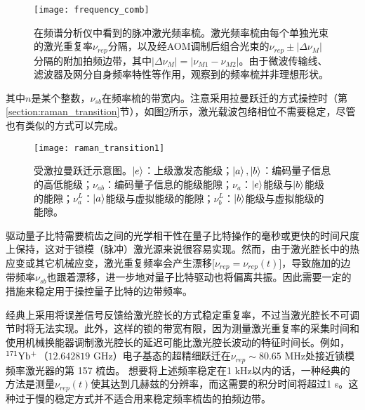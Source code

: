 \begin{figure}
    \centering
    \texttt{[image: frequency\_comb]}
    \caption[脉冲激光频率梳]{在频谱分析仪中看到的脉冲激光频率梳。激光频率梳由每个单独光束的激光重复率$\nu_{rep}$分隔，以及经AOM调制后组合光束的$\nu_{rep}\pm |\Delta \nu_M|$分隔的附加拍频边带，其中$|\Delta \nu_M|=|\nu_{M1}-\nu_{M2}|$。由于微波传输线、滤波器及网分自身频率特性等作用，观察到的频率梳并非理想形状。\label{fig:frequency_comb}}
\end{figure}

其中$n$是某个整数，$\nu_{sb}$在频率梳的带宽内。注意采用拉曼跃迁的方式操控时（第\ref{section:raman_transition}节），如图\ref{fig:raman_transition1}所示，激光载波包络相位不需要稳定\cite[]{Peer_Shapiro_Stowe_Shapiro_Ye_2007}，尽管也有类似的方式可以完成\cite[]{Koke_Grebing_Frei_Anderson_Assion_Steinmeyer_2010}。

\begin{figure}
    \centering
    \texttt{[image: raman\_transition1]}
    \caption[受激拉曼跃迁示意图]{受激拉曼跃迁示意图。$\ket{e}$：上级激发态能级；$\ket{a},\ket{b}$：编码量子信息的高低能级；$\nu_{ab}$：编码量子信息的能级能隙；$\nu_{a}$：$\ket{e}$能级与$\ket{b}$能级的能隙；$\nu_a^L$：$\ket{a}$能级与虚拟能级的能隙；$\nu_b^L$：$\ket{b}$能级与虚拟能级的能隙。\label{fig:raman_transition1}}
\end{figure}

驱动量子比特需要梳齿之间的光学相干性在量子比特操作的毫秒或更快的时间尺度上保持，这对于锁模（脉冲）激光源来说很容易实现\cite[]{Hayes_Matsukevich_Maunz_Hucul_Quraishi_Olmschenk_Campbell_Mizrahi_Senko_Monroe_2010}。然而，由于激光腔长中的热应变或其它机械应变，激光重复频率会产生漂移[$\nu_{rep}=\nu_{rep}(t)$]，导致施加的边带频率$\nu_{sb}$也跟着漂移，进一步地对量子比特驱动也将偏离共振。因此需要一定的措施来稳定用于操控量子比特的边带频率。

经典上采用将误差信号反馈给激光腔长的方式稳定重复率，不过当激光腔长不可调节时将无法实现。此外，这样的锁的带宽有限，因为测量激光重复率的采集时间和使用机械换能器调制激光腔长的延迟可能比激光腔长波动的特征时间长。例如，$\rm ^{171}Yb^+$（$12.642819 $ GHz）电子基态的超精细跃迁在$ \nu_{rep} \sim 80.65$ MHz处接近锁模频率激光器的第 157 梳齿。
想要将上述频率稳定在1 kHz以内的话，一种经典的方法是测量$\nu_{rep}(t)$使其达到几赫兹的分辨率，而这需要的积分时间将超过1 s\cite[]{Islam_Campbell_Choi_Clark_Conover_Debnath_Edwards_Fields_Hayes_Hucul_et_al_2014}。这种过于慢的稳定方式并不适合用来稳定频率梳齿的拍频边带。

